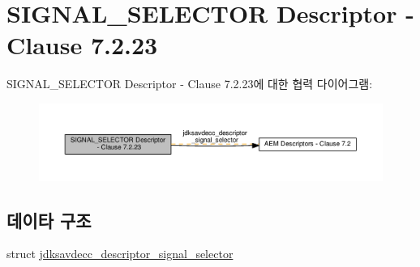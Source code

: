 \hypertarget{group__descriptor__signal__selector}{}\section{S\+I\+G\+N\+A\+L\+\_\+\+S\+E\+L\+E\+C\+T\+OR Descriptor -\/ Clause 7.2.23}
\label{group__descriptor__signal__selector}
S\+I\+G\+N\+A\+L\+\_\+\+S\+E\+L\+E\+C\+T\+OR Descriptor -\/ Clause 7.2.23에 대한 협력 다이어그램\+:
\nopagebreak
\begin{figure}[H]
\begin{center}
\leavevmode
\includegraphics[width=350pt]{group__descriptor__signal__selector}
\end{center}
\end{figure}
\subsection*{데이타 구조}
\begin{DoxyCompactItemize}
\item 
struct \hyperlink{structjdksavdecc__descriptor__signal__selector}{jdksavdecc\+\_\+descriptor\+\_\+signal\+\_\+selector}
\end{DoxyCompactItemize}
